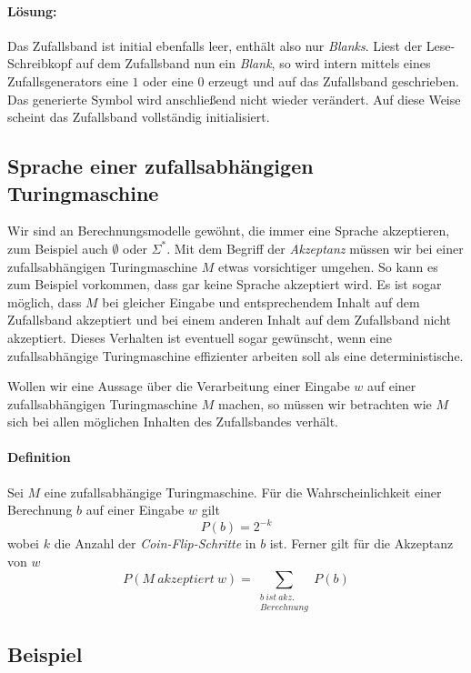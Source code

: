 \paragraph{Lösung:}
Das Zufallsband ist initial ebenfalls leer, enthält also nur \emph{Blanks}. 
Liest der Lese-Schreibkopf auf dem Zufallsband nun ein \emph{Blank}, so wird intern mittels eines Zufallsgenerators eine $1$ oder eine $0$ erzeugt und auf das Zufallsband geschrieben.
Das generierte Symbol wird anschließend nicht wieder verändert.
Auf diese Weise scheint das Zufallsband vollständig initialisiert.


\subsection{Sprache einer zufallsabhängigen Turingmaschine}
Wir sind an Berechnungsmodelle gewöhnt, die immer eine Sprache akzeptieren, zum Beispiel auch $\emptyset$ oder $\Sigma^*$.
Mit dem Begriff der \emph{Akzeptanz} müssen wir bei einer zufallsabhängigen Turingmaschine $M$ etwas vorsichtiger umgehen.
So kann es zum Beispiel vorkommen, dass gar keine Sprache akzeptiert wird.
Es ist sogar möglich, dass $M$ bei gleicher Eingabe und entsprechendem Inhalt auf dem Zufallsband akzeptiert und bei einem anderen Inhalt auf dem Zufallsband nicht akzeptiert.
Dieses Verhalten ist eventuell sogar gewünscht, wenn eine zufallsabhängige Turingmaschine effizienter arbeiten soll als eine deterministische.

Wollen wir eine Aussage über die Verarbeitung einer Eingabe $w$ auf einer zufallsabhängigen Turingmaschine $M$ machen, so müssen wir betrachten wie $M$ sich bei allen möglichen Inhalten des Zufallsbandes verhält.

\paragraph{Definition}
Sei $M$ eine zufallsabhängige Turingmaschine.
Für die Wahrscheinlichkeit einer Berechnung $b$ auf einer Eingabe $w$ gilt
\begin{equation*}
	P(b) = 2^{-k}
\end{equation*}
wobei $k$ die Anzahl der \emph{Coin-Flip-Schritte} in $b$ ist. 
Ferner gilt für die Akzeptanz von $w$
\begin{equation*}
	P(M\ akzeptiert\ w) = \sum_{\substack{b\ ist\ akz.\\ Berechnung}} P(b) 
\end{equation*}

\subsection{Beispiel}


